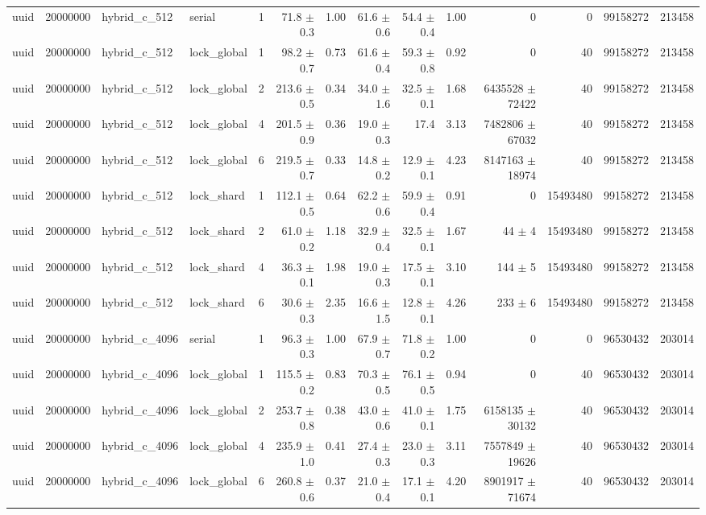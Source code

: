 \begin{tabular}{lllllrrrrrrrrr}
uuid & 20000000 & hybrid\_c\_512 & serial & 1 & 71.8 $\pm$ 0.3 & 1.00 & 61.6 $\pm$ 0.6 & 54.4 $\pm$ 0.4 & 1.00 & 0 & 0 & 99158272 & 213458 \\
uuid & 20000000 & hybrid\_c\_512 & lock\_global & 1 & 98.2 $\pm$ 0.7 & 0.73 & 61.6 $\pm$ 0.4 & 59.3 $\pm$ 0.8 & 0.92 & 0 & 40 & 99158272 & 213458 \\
uuid & 20000000 & hybrid\_c\_512 & lock\_global & 2 & 213.6 $\pm$ 0.5 & 0.34 & 34.0 $\pm$ 1.6 & 32.5 $\pm$ 0.1 & 1.68 & 6435528 $\pm$ 72422 & 40 & 99158272 & 213458 \\
uuid & 20000000 & hybrid\_c\_512 & lock\_global & 4 & 201.5 $\pm$ 0.9 & 0.36 & 19.0 $\pm$ 0.3 & 17.4 & 3.13 & 7482806 $\pm$ 67032 & 40 & 99158272 & 213458 \\
uuid & 20000000 & hybrid\_c\_512 & lock\_global & 6 & 219.5 $\pm$ 0.7 & 0.33 & 14.8 $\pm$ 0.2 & 12.9 $\pm$ 0.1 & 4.23 & 8147163 $\pm$ 18974 & 40 & 99158272 & 213458 \\
uuid & 20000000 & hybrid\_c\_512 & lock\_shard & 1 & 112.1 $\pm$ 0.5 & 0.64 & 62.2 $\pm$ 0.6 & 59.9 $\pm$ 0.4 & 0.91 & 0 & 15493480 & 99158272 & 213458 \\
uuid & 20000000 & hybrid\_c\_512 & lock\_shard & 2 & 61.0 $\pm$ 0.2 & 1.18 & 32.9 $\pm$ 0.4 & 32.5 $\pm$ 0.1 & 1.67 & 44 $\pm$ 4 & 15493480 & 99158272 & 213458 \\
uuid & 20000000 & hybrid\_c\_512 & lock\_shard & 4 & 36.3 $\pm$ 0.1 & 1.98 & 19.0 $\pm$ 0.3 & 17.5 $\pm$ 0.1 & 3.10 & 144 $\pm$ 5 & 15493480 & 99158272 & 213458 \\
uuid & 20000000 & hybrid\_c\_512 & lock\_shard & 6 & 30.6 $\pm$ 0.3 & 2.35 & 16.6 $\pm$ 1.5 & 12.8 $\pm$ 0.1 & 4.26 & 233 $\pm$ 6 & 15493480 & 99158272 & 213458 \\
uuid & 20000000 & hybrid\_c\_4096 & serial & 1 & 96.3 $\pm$ 0.3 & 1.00 & 67.9 $\pm$ 0.7 & 71.8 $\pm$ 0.2 & 1.00 & 0 & 0 & 96530432 & 203014 \\
uuid & 20000000 & hybrid\_c\_4096 & lock\_global & 1 & 115.5 $\pm$ 0.2 & 0.83 & 70.3 $\pm$ 0.5 & 76.1 $\pm$ 0.5 & 0.94 & 0 & 40 & 96530432 & 203014 \\
uuid & 20000000 & hybrid\_c\_4096 & lock\_global & 2 & 253.7 $\pm$ 0.8 & 0.38 & 43.0 $\pm$ 0.6 & 41.0 $\pm$ 0.1 & 1.75 & 6158135 $\pm$ 30132 & 40 & 96530432 & 203014 \\
uuid & 20000000 & hybrid\_c\_4096 & lock\_global & 4 & 235.9 $\pm$ 1.0 & 0.41 & 27.4 $\pm$ 0.3 & 23.0 $\pm$ 0.3 & 3.11 & 7557849 $\pm$ 19626 & 40 & 96530432 & 203014 \\
uuid & 20000000 & hybrid\_c\_4096 & lock\_global & 6 & 260.8 $\pm$ 0.6 & 0.37 & 21.0 $\pm$ 0.4 & 17.1 $\pm$ 0.1 & 4.20 & 8901917 $\pm$ 71674 & 40 & 96530432 & 203014 \\

\end{tabular}
